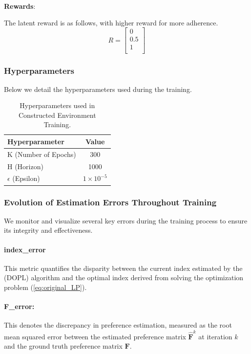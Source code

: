 \documentclass{article} %
\newcommand{\DOPL}{\textsc{DOPL}\xspace}
\newcommand{\bF}{\mathbf{F}}
\begin{document}
{\textbf{Rewards}:

The latent reward is as follows, with higher reward for more adherence.
\[
R = \begin{bmatrix}
0 \\
0.5 \\
1 \\
\end{bmatrix}
\]

\subsubsection{Hyperparameters}
Below we detail the hyperparameters used during the training.

\begin{table}[h!]
\centering
\begin{tabular}{|l|c|}
\hline
\textbf{Hyperparameter} & \textbf{Value} \\ \hline
K (Number of Epochs) & 300 \\ \hline
H (Horizon) & 1000 \\ \hline
$\epsilon$ (Epsilon) & $1 \times 10^{-5}$ \\ \hline
\end{tabular}
\caption{Hyperparameters used in Constructed Environment Training.}
\label{tab:hyperparameters_cpap}
\end{table}

\subsubsection{Evolution of Estimation Errors Throughout Training}

We monitor and visualize several key errors during the training process to ensure its integrity and effectiveness.

\paragraph{index\_error}
This metric quantifies the disparity between the current index estimated by the (\DOPL) algorithm and the optimal index derived from solving the optimization problem (\ref{eq:original_LP}).

\paragraph{F\_error:}
This denotes the discrepancy in preference estimation, measured as the root mean squared error between the estimated preference matrix $\hat{\bF}^k$ at iteration $k$ and the ground truth preference matrix $\bF$.

}
\end{document}
